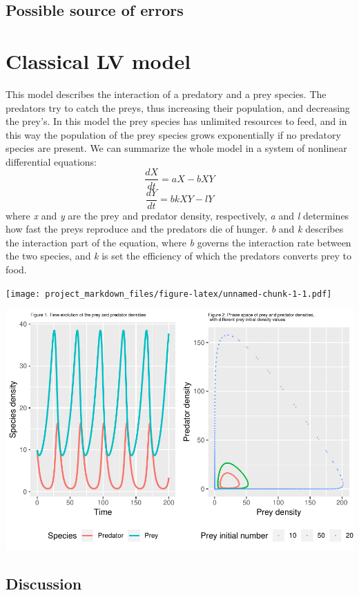 \documentclass[]{article}
\begin{document}
\subsection{Possible source of errors}\label{possible-source-of-errors}

\section{Classical LV model}\label{classical-lv-model}

This model describes the interaction of a predatory and a prey species.
The predators try to catch the preys, thus increasing their population,
and decreasing the prey's. In this model the prey species has unlimited
resources to feed, and in this way the population of the prey species
grows exponentially if no predatory species are present. We can
summarize the whole model in a system of nonlinear differential
equations: \[
\frac{dX}{dt}= aX-bXY
\] \[
\frac{dY}{dt}= bkXY-lY
\] where \emph{x} and \emph{y} are the prey and predator density,
respectively, \emph{a} and \emph{l} determines how fast the preys
reproduce and the predators die of hunger. \emph{b} and \emph{k}
describes the interaction part of the equation, where \emph{b} governs
the interaction rate between the two species, and \emph{k} is set the
efficiency of which the predators converts prey to food.

\texttt{[image: project\_markdown\_files/figure-latex/unnamed-chunk-1-1.pdf]}

\includegraphics{project_markdown_files/figure-latex/unnamed-chunk-2-1.pdf}

\subsection{Discussion}\label{discussion}
\end{document}
